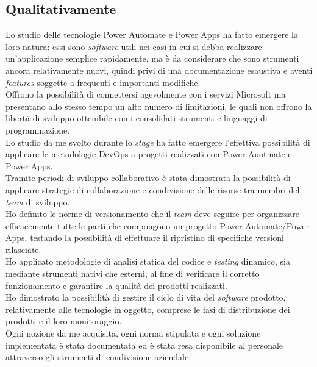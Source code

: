 \subsection{Qualitativamente}
Lo studio delle tecnologie Power Automate e Power Apps ha fatto emergere la loro natura: essi sono \emph{software} utili nei casi in cui si debba realizzare un'applicazione semplice rapidamente, ma è da considerare che sono strumenti ancora relativamente nuovi, quindi privi di una documentazione esaustiva e aventi \emph{features} soggette a frequenti e importanti modifiche.\\
Offrono la possibilità di connettersi agevolmente con i servizi Microsoft ma presentano allo stesso tempo un alto numero di limitazioni, le quali non offrono la libertà di sviluppo ottenibile con i consolidati strumenti e linguaggi di programmazione.\\ 
Lo studio da me svolto durante lo \emph{stage} ha fatto emergere l'effettiva possibilità di applicare le metodologie \gls{DevOps} a progetti realizzati con Power Auotmate e Power Apps.\\
Tramite periodi di sviluppo collaborativo è stata dimostrata la possibilità di applicare strategie di collaborazione e condivisione delle risorse tra membri del \emph{team} di sviluppo.\\ 
Ho definito le norme di versionamento che il \emph{team} deve seguire per organizzare efficacemente tutte le parti che compongono un progetto Power Automate/Power Apps, testando la possibilità di effettuare il ripristino di specifiche versioni rilasciate.\\ 
Ho applicato metodologie di analisi statica del codice e \emph{testing} dinamico, sia mediante strumenti nativi che esterni, al fine di verificare il corretto funzionamento e garantire la qualità dei prodotti realizzati.\\ 
Ho dimostrato la possibilità di gestire il ciclo di vita del \emph{software} prodotto, relativamente alle tecnologie in oggetto, comprese le fasi di distribuzione dei prodotti e il loro monitoraggio.\\ 
Ogni nozione da me acquisita, ogni norma stipulata e ogni soluzione implementata è stata documentata ed è stata resa disponibile al personale attraverso gli strumenti di condivisione aziendale. 

